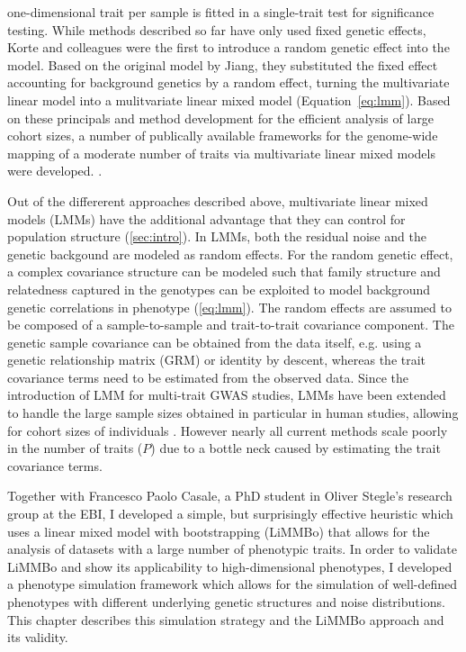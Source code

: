 one-dimensional trait per sample is fitted in a single-trait test for significance testing.  While methods described so far have only used fixed genetic effects, Korte and colleagues \citeyear{Korte2012} were the first to introduce a random genetic effect into the model. Based on the original model by Jiang, they substituted the fixed effect accounting for background genetics by a random effect, turning the multivariate linear model into a mulitvariate linear mixed model (Equation~\ref{eq:lmm}). Based on these principals and method development for the efficient analysis of large cohort sizes, a number of publically available frameworks for the genome-wide mapping of a moderate number of traits via multivariate linear mixed models were developed. \citep{Korte2012,Yang2011,Lippert2014,Zhou2014,Casale2015}. 

Out of the differerent approaches described above, multivariate linear mixed models (LMMs) have the additional advantage that they can control for population structure (\cref{sec:intro}). In LMMs, both the residual noise and the genetic backgound are modeled as random effects. For the random genetic effect, a complex covariance structure can be modeled such that family structure and relatedness captured in the genotypes can be exploited to model background genetic correlations in phenotype\citep{Yu2006,Kang2008} (\cref{eq:lmm}). The random effects are assumed to be composed of a sample-to-sample and trait-to-trait covariance component. The genetic sample covariance can be obtained from the data itself, e.g. using a genetic relationship matrix (GRM) or identity by descent, whereas the trait covariance terms need to be estimated from the observed data. Since the introduction of LMM for multi-trait GWAS studies, LMMs have been extended to handle the large sample sizes obtained in particular in human studies, allowing for cohort sizes of   individuals \citep{Zhou2014}. However nearly all current methods scale poorly in the number of traits ($P$) due to a bottle neck caused by estimating the trait covariance terms. 

Together with Francesco Paolo Casale, a PhD student in Oliver Stegle's research group at the EBI, I developed a simple, but surprisingly effective heuristic which uses a linear mixed model with bootstrapping (LiMMBo) that allows for the analysis of datasets with a large number of phenotypic traits. In order to validate LiMMBo and show its applicability to high-dimensional phenotypes, I developed a phenotype simulation framework which allows for the simulation of well-defined phenotypes with different underlying genetic structures and noise distributions. This chapter describes this simulation strategy and the LiMMBo approach and its validity. 

